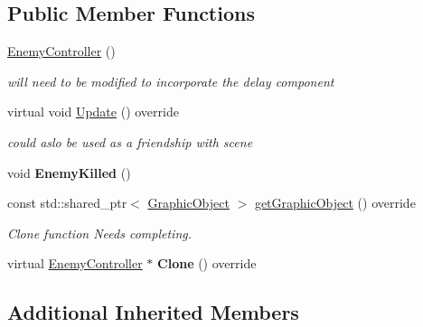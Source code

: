 \subsection*{Public Member Functions}
\begin{DoxyCompactItemize}
\item 
\mbox{\label{class_enemy_controller_a316e9275d1a1f46fef09907458e5e286}} 
\hyperlink{class_enemy_controller_a316e9275d1a1f46fef09907458e5e286}{Enemy\+Controller} ()
\begin{DoxyCompactList}\small\item\em will need to be modified to incorporate the delay component \end{DoxyCompactList}\item 
\mbox{\label{class_enemy_controller_af36ec67442d30c7519581b83ad6c00db}} 
virtual void \hyperlink{class_enemy_controller_af36ec67442d30c7519581b83ad6c00db}{Update} () override
\begin{DoxyCompactList}\small\item\em could aslo be used as a friendship with scene \end{DoxyCompactList}\item 
\mbox{\label{class_enemy_controller_a011030dd51b78317ecb16356bf6591dc}} 
void {\bfseries Enemy\+Killed} ()
\item 
\mbox{\label{class_enemy_controller_ac1166e21eb78c9d70296adc56d74caff}} 
const std\+::shared\+\_\+ptr$<$ \hyperlink{class_graphic_object}{Graphic\+Object} $>$ \hyperlink{class_enemy_controller_ac1166e21eb78c9d70296adc56d74caff}{get\+Graphic\+Object} () override
\begin{DoxyCompactList}\small\item\em Clone function Needs completing. \end{DoxyCompactList}\item 
\mbox{\label{class_enemy_controller_a3e48995e2828fb54d7df203985c0f855}} 
virtual \hyperlink{class_enemy_controller}{Enemy\+Controller} $\ast$ {\bfseries Clone} () override
\end{DoxyCompactItemize}
\subsection*{Additional Inherited Members}


